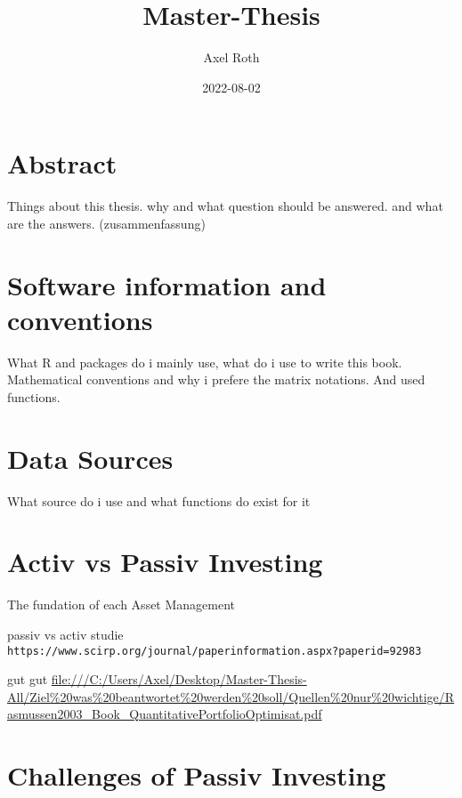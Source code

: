 \documentclass[
  oneside]{book}
\title{Master-Thesis}
\author{Axel Roth}
\date{2022-08-02}
\begin{document}
\maketitle

{
\setcounter{tocdepth}{1}
\tableofcontents
}
\hypertarget{abstract}{%
\chapter{Abstract}\label{abstract}}

Things about this thesis. why and what question should be answered. and what are the answers. (zusammenfassung)

\hypertarget{software-information-and-conventions}{%
\chapter{Software information and conventions}\label{software-information-and-conventions}}

What R and packages do i mainly use, what do i use to write this book. Mathematical conventions and why i prefere the matrix notations. And used functions.

\hypertarget{data-sources}{%
\chapter{Data Sources}\label{data-sources}}

What source do i use and what functions do exist for it

\hypertarget{activ-vs-passiv-investing}{%
\chapter{Activ vs Passiv Investing}\label{activ-vs-passiv-investing}}

The fundation of each Asset Management

passiv vs activ studie
\texttt{https://www.scirp.org/journal/paperinformation.aspx?paperid=92983}

gut gut
\url{file:///C:/Users/Axel/Desktop/Master-Thesis-All/Ziel\%20was\%20beantwortet\%20werden\%20soll/Quellen\%20nur\%20wichtige/Rasmussen2003_Book_QuantitativePortfolioOptimisat.pdf}

\hypertarget{challenges-of-passiv-investing}{%
\chapter{Challenges of Passiv Investing}\label{challenges-of-passiv-investing}}
\end{document}

